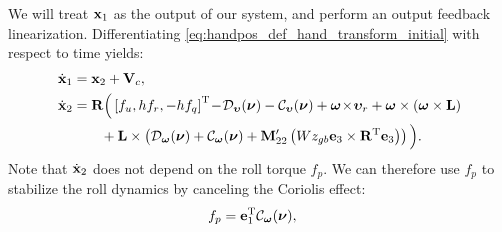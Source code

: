 We will treat $\mathbf{x}_1$ as the output of our system, and perform an output feedback linearization.
Differentiating \eqref{eq:handpos_def_hand_transform_initial} with respect to time yields:
\begin{subequations}
    \begin{align}
        \dot{\mathbf{x}}_1 &= \mathbf{x}_2 + \mathbf{V}_c, \\
        \dot{\mathbf{x}}_2 &= \mathbf{R}\Big(\left[f_u, hf_r, -hf_q\right]^{\mathrm{T}}\! - \!\mathcal{D}_{\bm{\upsilon}}(\bm{\nu}) - \mathcal{C}_{\bm{\upsilon}}(\bm{\nu}) + \bm{\omega} \!\times\! \bm{\upsilon}_r + \bm{\omega} \times \left(\bm{\omega} \times \mathbf{L}\right) \label{eq:handpos_def_x_2_dot} \\
        & \qquad + \mathbf{L} \times \left(\mathcal{D}_{\bm{\omega}}(\bm{\nu}) + \mathcal{C}_{\bm{\omega}}(\bm{\nu}) + \mathbf{M}_{22}^{\prime}\left(Wz_{gb} \mathbf{e}_3 \times \mathbf{R}^{\mathrm{T}} \mathbf{e}_3\right)\right) \Big). \nonumber
    \end{align}
\end{subequations}
Note that $\dot{\mathbf{x}}_2$ does not depend on the roll torque $f_p$.
We can therefore use $f_p$ to stabilize the roll dynamics by canceling the Coriolis effect:
\begin{align}
    f_p &= \mathbf{e}_1^{\mathrm{T}} \mathcal{C}_{\bm{\omega}}(\bm{\nu}), \label{eq:handpos_def_roll_torque}
\end{align}

